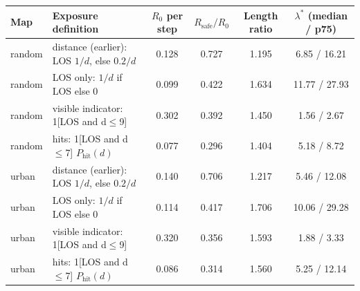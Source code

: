 \begin{tabular}{llcccc}
\toprule
Map & Exposure definition & $R_0$ per step & $R_{\mathrm{safe}}/R_0$ & Length ratio & $\lambda^{*}$ (median / p75) \\
\midrule
random & distance (earlier): LOS $1/d$, else $0.2/d$ & 0.128 & 0.727 & 1.195 & 6.85 / 16.21 \\
random & LOS only: $1/d$ if LOS else 0 & 0.099 & 0.422 & 1.634 & 11.77 / 27.93 \\
random & visible indicator: 1[LOS and d$\le$9] & 0.302 & 0.392 & 1.450 & 1.56 / 2.67 \\
random & hits: 1[LOS and d$\le$7] $P_{\mathrm{hit}}(d)$ & 0.077 & 0.296 & 1.404 & 5.18 / 8.72 \\
urban & distance (earlier): LOS $1/d$, else $0.2/d$ & 0.140 & 0.706 & 1.217 & 5.46 / 12.08 \\
urban & LOS only: $1/d$ if LOS else 0 & 0.114 & 0.417 & 1.706 & 10.06 / 29.28 \\
urban & visible indicator: 1[LOS and d$\le$9] & 0.320 & 0.356 & 1.593 & 1.88 / 3.33 \\
urban & hits: 1[LOS and d$\le$7] $P_{\mathrm{hit}}(d)$ & 0.086 & 0.314 & 1.560 & 5.25 / 12.14 \\
\bottomrule
\end{tabular}
